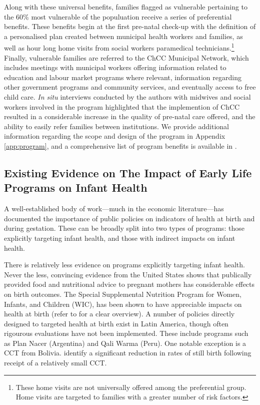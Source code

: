 \documentclass[12pt]{article}
\begin{document}
\begin{spacing}{1.4}
Along with these universal benefits, families flagged as vulnerable
pertaining to the 60\% most vulnerable of the populuation receive a
series of preferential benefits.  These benefits begin at the
first pre-natal check-up with the definition of a personalised
plan created between municipal health workers and families, as
well as hour long home visits from social workers paramedical
technicians.\footnote{These home visits are not universally
  offered among the preferential group.  Home visits are targeted
  to families with a greater number of risk factors.} Finally,
vulnerable families are referred to the ChCC Municipal Network,
which includes meetings with municipal workers offering information
related to education and labour market programs where relevant,
information regarding other government programs and community
services, and eventually access to free child care. \emph{In situ}
interviews conducted by the authors with midwives and social
workers involved in the program highlighted that the implemention
of ChCC resulted in a considerable increase in the quality of
pre-natal care offered, and the ability to easily refer families
between institutions.  We provide additional information regarding
the scope and design of the program in Appendix \ref{app:program},
and a comprehensive list of program benefits is available in
\citet{MDS2014}.

\subsection{Existing Evidence on The Impact of Early Life Programs on Infant Health}
A well-established body of work---much in the economic
literature---has documented the importance of public policies
on indicators of health at birth and during gestation.  These
can be broadly split into two types of programs: those explicitly
targeting infant health, and those with indirect impacts on
infant health.

There is relatively less evidence on programs explicitly
targeting infant health. Never the less, convincing evidence
from the United States shows that publically provided food and
nutritional advice to pregnant mothers has considerable effects
on birth outcomes.  The Special Supplemental Nutrition Program
for Women, Infants, and Children (WIC), has been shown to have
appreciable impacts on health at birth (refer to
\citet{BitlerKaroly2015} for a clear overview).  A number of
policies directly designed to targeted health at birth exist
in Latin America, though often rigourous evaluations have not
been implemented. These include programs such as Plan Nacer
(Argentina) and Qali Warma (Peru).  One notable exception is
a CCT from Bolivia.  \citet{Celhayetal2016} identify a significant
reduction in rates of still birth following receipt of a relatively
small CCT.


\end{spacing}
\end{document}
